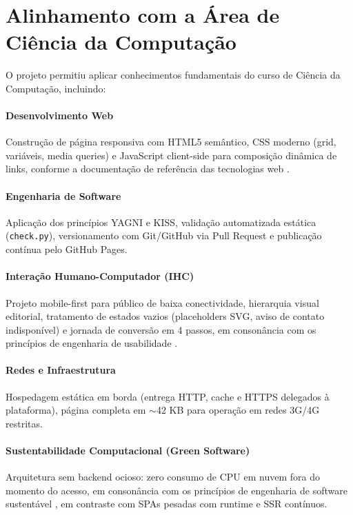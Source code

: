 \documentclass[12pt,a4paper]{article}
\begin{document}
\section{Alinhamento com a Área de Ciência da Computação}

O projeto permitiu aplicar conhecimentos fundamentais do curso de Ciência da Computação, incluindo:

\paragraph{Desenvolvimento Web}
Construção de página responsiva com HTML5 semântico, CSS moderno (grid, variáveis, media queries) e JavaScript client-side para composição dinâmica de links, conforme a documentação de referência das tecnologias web \cite{mdn}.

\paragraph{Engenharia de Software}
Aplicação dos princípios YAGNI e KISS, validação automatizada estática (\texttt{check.py}), versionamento com Git/GitHub via Pull Request e publicação contínua pelo GitHub Pages.

\paragraph{Interação Humano-Computador (IHC)}
Projeto mobile-first para público de baixa conectividade, hierarquia visual editorial, tratamento de estados vazios (placeholders SVG, aviso de contato indisponível) e jornada de conversão em 4 passos, em consonância com os princípios de engenharia de usabilidade \cite{nielsen1993}.

\paragraph{Redes e Infraestrutura}
Hospedagem estática em borda (entrega HTTP, cache e HTTPS delegados à plataforma), página completa em $\sim$42 KB para operação em redes 3G/4G restritas.

\paragraph{Sustentabilidade Computacional (Green Software)}
Arquitetura sem backend ocioso: zero consumo de CPU em nuvem fora do momento do acesso, em consonância com os princípios de engenharia de software sustentável \cite{gsf}, em contraste com SPAs pesadas com runtime e SSR contínuos.
\end{document}

